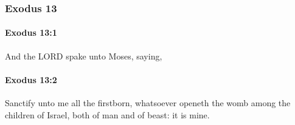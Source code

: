 	\subsubsection{Exodus 13} %
		\label{EXODUS-13}

		\paragraph{Exodus 13:1} %
			\label{EXODUS-13-1}

			And the LORD spake unto Moses, saying,


		\paragraph{Exodus 13:2} %
			\label{EXODUS-13-2}

			Sanctify unto me all the firstborn, whatsoever openeth the womb among the children of Israel, both of man and of beast: it is mine.

